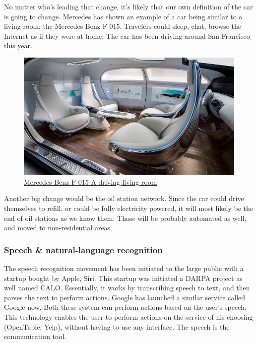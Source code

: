 \documentclass[12pt]{article}
\begin{document}
\smallskip

No matter who's leading that change, it's likely that our own definition of the
car is going to change. Mercedes has shown an example of a car being similar to
a living room: the Mercedes-Benz F 015. Travelers could sleep, chat, browse the
Internet as if they were at home. The car has been driving around San Francisco
this year.

\smallskip
\begin{figure}[ht]
    \centering
    \includegraphics[width=\linewidth]{mercedes}
    \caption{\href{http://www.entrepreneur.com/article/243751}
    {Mercedes Benz F 015 A driving living room}}
    \label{fig:mercedesBenz}
\end{figure}

\smallskip

Another big change would be the oil station network. Since the car could drive
themselves to refill, or could be fully electricity powered, it will most likely
be the end of oil stations as we know them. Those will be probably automated as
well, and moved to non-residential areas.


\subsubsection{Speech \& natural-language recognition}

The speech recognition movement has been initiated to the large public with a
startup bought by Apple, Siri. This startup was initiated a DARPA project as
well named CALO. Essentially, it works by transcribing speech to text, and then
parses the text to perform actions. Google has launched a similar service called
Google now. Both these system can perform actions based on the user's speech.
This technology enables the user to perform actions on the service of his
choosing (OpenTable, Yelp), without having to use any interface. The speech is
the communication tool.
\end{document}
